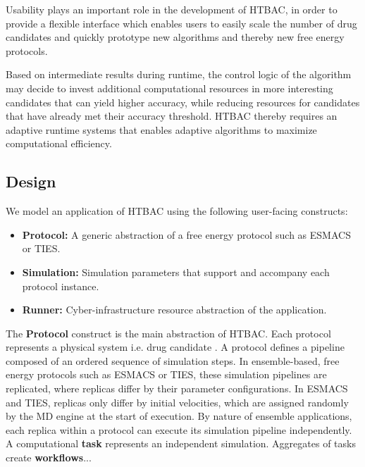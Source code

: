 Usability plays an important role in the development of HTBAC, in order to
provide a flexible interface which enables users to easily scale the number
of drug candidates and quickly prototype new algorithms and thereby new free
energy protocols.

Based on intermediate results during runtime, the control logic of the
algorithm may decide to invest additional computational resources in more
interesting candidates that can yield higher accuracy, while reducing
resources for candidates that have already met their accuracy threshold.
HTBAC thereby requires an adaptive runtime systems that
enables adaptive algorithms to maximize computational
efficiency.

\subsection{Design}

We model an application of HTBAC using the following user-facing constructs:

\begin{itemize}
  \item \textbf{Protocol:} A generic abstraction of a free energy protocol
  such as ESMACS or TIES.
  \item \textbf{Simulation:} Simulation parameters that support and accompany
  each protocol instance.
  \item \textbf{Runner:} Cyber-infrastructure resource abstraction of the
  application.
\end{itemize}

The \textbf{Protocol} construct is the main abstraction of HTBAC. Each
protocol represents a physical system i.e. drug candidate . A protocol defines a %
pipeline composed of an ordered sequence of simulation steps. In
ensemble-based, free energy protocols such as ESMACS or TIES, these
simulation pipelines are replicated, where replicas differ by their parameter
configurations. In ESMACS and TIES, replicas only differ by initial
velocities, which are assigned randomly by the MD engine at the start of
execution. By nature of ensemble applications, each replica within a protocol
can execute its simulation pipeline independently. A computational
\textbf{task} represents an independent simulation. Aggregates of tasks
create \textbf{workflows}...

